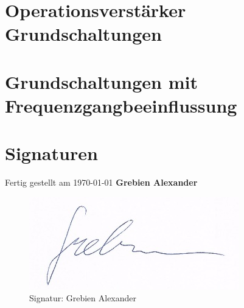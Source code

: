 \newcommand{\german}{true} %
\newcommand{\coloredTitlePage}{true} %
\newcommand{\company}{false}
\newcommand{\ECE}{true}

\usepackage{hyperref}

\makeglossaries



\makeatletter
\newcommand{\myscope}[2] %
{\draw[thick,rotate=#2] (#1) circle (12pt)
 (#1) ++(-0.35,-0.1) -- ++(0.3,0.3) --++(0,-0.3)-- ++(0.3,0.3) --++(0,-0.3);
}
%


\frontmatter
\renewcommand{\thepage}{\Roman{page}}



\tableofcontents
\printglossary
\mainmatter
\chapter{Operationsverstärker Grundschaltungen}


\chapter{Grundschaltungen mit Frequenzgangbeeinflussung}


\newpage
\chapter{Signaturen}
    Fertig gestellt am \today
    \textbf{Grebien Alexander}
    \begin{figure}[H]
        \centering
        \includegraphics{pics/signature_grebien.png}
    	\caption{Signatur: Grebien Alexander}
    	\label{pic:signatur_grebien}
    \end{figure}
        
\listoffigures
\listoftables


